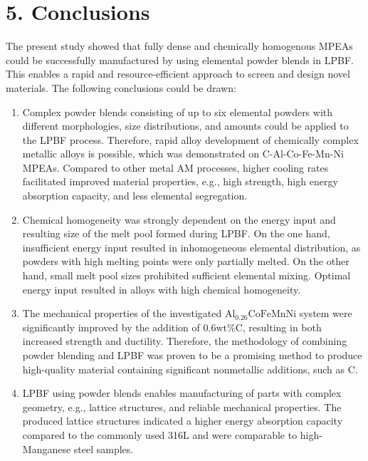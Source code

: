 \documentclass[10pt]{article}
\begin{document}
\section*{5. Conclusions}
The present study showed that fully dense and chemically homogenous MPEAs could be successfully manufactured by using elemental powder blends in LPBF. This enables a rapid and resource-efficient approach to screen and design novel materials. The following conclusions could be drawn:

\begin{enumerate}
  \item Complex powder blends consisting of up to six elemental powders with different morphologies, size distributions, and amounts could be applied to the LPBF process. Therefore, rapid alloy development of chemically complex metallic alloys is possible, which was demonstrated on C-Al-Co-Fe-Mn-Ni MPEAs. Compared to other metal AM processes, higher cooling rates facilitated improved material properties, e.g., high strength, high energy absorption capacity, and less elemental segregation.

  \item Chemical homogeneity was strongly dependent on the energy input and resulting size of the melt pool formed during LPBF. On the one hand, insufficient energy input resulted in inhomogeneous elemental distribution, as powders with high melting points were only partially melted. On the other hand, small melt pool sizes prohibited sufficient elemental mixing. Optimal energy input resulted in alloys with high chemical homogeneity.

  \item The mechanical properties of the investigated $\mathrm{Al}_{0.26} \mathrm{CoFeMnNi}$ system were significantly improved by the addition of $0.6 \mathrm{wt} \% \mathrm{C}$, resulting in both increased strength and ductility. Therefore, the methodology of combining powder blending and LPBF was proven to be a promising method to produce high-quality material containing significant nonmetallic additions, such as $\mathrm{C}$.

  \item LPBF using powder blends enables manufacturing of parts with complex geometry, e.g., lattice structures, and reliable mechanical properties. The produced lattice structures indicated a higher energy absorption capacity compared to the commonly used 316L and were comparable to high-Manganese steel samples.

\end{enumerate}
\end{document}
